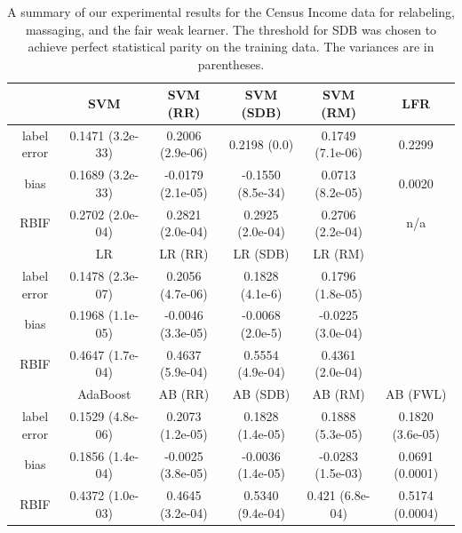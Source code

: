 \documentclass[conference]{IEEEtran}
\begin{document}

\begin{table}
\centering
\begin{tabular}{| c | ccccc |}
\hline
               & SVM & SVM (RR) & SVM (SDB) & SVM (RM) & LFR \cite{ZemelWSPD13} \\
\hline 
label error    & 0.1471 (3.2e-33)  & 0.2006 (2.9e-06) & 0.2198 (0.0) & 0.1749 (7.1e-06) & 0.2299 \\ 
bias           & 0.1689 (3.2e-33)  &  -0.0179 (2.1e-05) &  -0.1550 (8.5e-34) & 0.0713 (8.2e-05) & 0.0020 \\ 
RBIF           & 0.2702 (2.0e-04) & 0.2821 (2.0e-04) & 0.2925 (2.0e-04) & 0.2706 (2.2e-04) & n/a \\ 
\hline
               & LR & LR (RR) & LR (SDB) & LR (RM) & \\
\hline 
label error    & 0.1478 (2.3e-07)  & 0.2056 (4.7e-06)  & 0.1828 (4.1e-6) & 0.1796 (1.8e-05) & \\ 
bias           & 0.1968 (1.1e-05) & -0.0046 (3.3e-05)  & -0.0068 (2.0e-5) &  -0.0225 (3.0e-04) & \\ 
RBIF           & 0.4647 (1.7e-04)   & 0.4637 (5.9e-04) & 0.5554 (4.9e-04) & 0.4361 (2.0e-04) &  \\ 
\hline
               & AdaBoost & AB (RR)  & AB (SDB)  & AB (RM)   & AB (FWL)  \\
\hline 
label error    & 0.1529 (4.8e-06)  & 0.2073 (1.2e-05)  & 0.1828 (1.4e-05) & 0.1888 (5.3e-05) & 0.1820 (3.6e-05)\\ 
bias           & 0.1856 (1.4e-04)  &  -0.0025 (3.8e-05) &  -0.0036 (1.4e-05) & -0.0283 (1.5e-03) & 0.0691 (0.0001) \\ 
RBIF           & 0.4372 (1.0e-03)  & 0.4645 (3.2e-04)  & 0.5340 (9.4e-04) & 0.421 (6.8e-04) & 0.5174 (0.0004) \\ 
\hline
\hline 
\end{tabular}
\caption{A summary of our experimental results for the Census Income data for relabeling, massaging, and
the fair weak learner. The threshold for SDB was chosen to achieve perfect
statistical parity on the training data.  The variances are in parentheses.}
\label{table:census_results}
\end{table}
\end{document}
